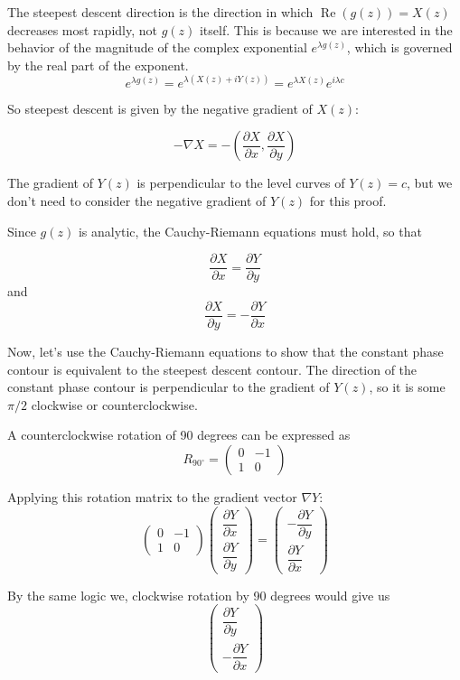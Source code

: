 The steepest descent direction is the direction in which $\operatorname{Re}(g(z)) = X(z)$
decreases most rapidly, not $g(z)$ itself.
This is because we are interested in the behavior of the magnitude of the complex exponential
$e^{\lambda g(z)}$, which is governed by the real part of the exponent.
$$
e^{\lambda g(z)} = e^{\lambda (X(z) + iY(z))} = e^{\lambda X(z)} e^{i\lambda c}
$$

So steepest descent is given by the negative gradient of $X(z)$:

$$
-\nabla X = -\left(\frac{\partial X}{\partial x}, \frac{\partial X}{\partial y}\right)
$$


The gradient of $Y(z)$ is perpendicular to the level curves of $Y(z) = c$,
but we don't need to consider the negative gradient of $Y(z)$ for this proof.



Since $g(z)$ is analytic, the Cauchy-Riemann equations must hold, so that

$$
\frac{\partial X}{\partial x} = \frac{\partial Y}{\partial y}
$$
and
$$
\frac{\partial X}{\partial y} = -\frac{\partial Y}{\partial x}
$$


Now, let's use the Cauchy-Riemann equations to show that the constant phase contour is equivalent
to the steepest descent contour.
The direction of the constant phase contour is perpendicular to the gradient of $Y(z)$, so it is
some $\pi/2$ clockwise or counterclockwise.

A counterclockwise rotation of 90 degrees can be expressed as
$$
R_{90^\circ}
= \begin{pmatrix}
    0 &  -1 \\
    1 & 0
\end{pmatrix}
$$

Applying this rotation matrix to the gradient vector $\nabla Y$:
$$
\begin{pmatrix}
    0 & -1 \\[1em]
    1 & 0
\end{pmatrix}
\begin{pmatrix}
    \dfrac{\partial Y}{\partial x} \\[1em]
    \dfrac{\partial Y}{\partial y}
\end{pmatrix}
= \begin{pmatrix}
    -\dfrac{\partial Y}{\partial y} \\[1em]
    \dfrac{\partial Y}{\partial x}
\end{pmatrix}
$$

By the same logic we, clockwise rotation by 90 degrees would give us
$$
\begin{pmatrix}
    \dfrac{\partial Y}{\partial y} \\[1em]
    -\dfrac{\partial Y}{\partial x}
\end{pmatrix}
$$



